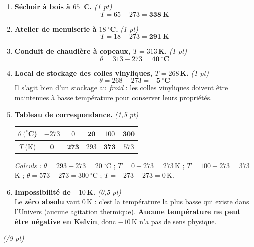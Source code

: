 \documentclass[a4paper,11pt]{article}
\begin{document}
\begin{enumerate}[label=\textbf{\arabic*.},leftmargin=*,itemsep=4pt]

\item \textbf{Séchoir à bois à $65\ ^\circ$C.} \hfill\textit{\small(1 pt)}
\[ T = 65 + 273 = \mathbf{338\ \text{K}} \]

\item \textbf{Atelier de menuiserie à $18\ ^\circ$C.} \hfill\textit{\small(1 pt)}
\[ T = 18 + 273 = \mathbf{291\ \text{K}} \]

\item \textbf{Conduit de chaudière à copeaux, $T = 313$\,K.} \hfill\textit{\small(1 pt)}
\[ \theta = 313 - 273 = \mathbf{40\ ^\circ\text{C}} \]

\item \textbf{Local de stockage des colles vinyliques, $T = 268$\,K.} \hfill\textit{\small(1 pt)}
\[ \theta = 268 - 273 = \mathbf{-5\ ^\circ\text{C}} \]
Il s'agit bien d'un stockage au \emph{froid} : les colles vinyliques doivent être maintenues à basse température pour conserver leurs propriétés.

\item \textbf{Tableau de correspondance.} \hfill\textit{\small(1,5 pt)}
\begin{center}
\renewcommand{\arraystretch}{1.35}
\begin{tabular}{|>{\columncolor{violetclair}}c|c|c|c|c|c|}
\hline
\rowcolor{violetclair}
$\theta\ (^\circ$C) & $-273$ & $0$ & $\mathbf{20}$ & $100$ & $\mathbf{300}$ \\
\hline
$T\ $(K) & $\mathbf{0}$ & $\mathbf{273}$ & $293$ & $\mathbf{373}$ & $573$ \\
\hline
\end{tabular}
\end{center}
\textit{Calculs :} $\theta = 293 - 273 = 20\ ^\circ$C ; $T = 0 + 273 = 273$\,K ; $T = 100 + 273 = 373$\,K ; $\theta = 573 - 273 = 300\ ^\circ$C ; $T = -273 + 273 = 0$\,K.

\item \textbf{Impossibilité de $-10$\,K.} \hfill\textit{\small(0,5 pt)}\\
Le \textbf{zéro absolu} vaut $0$\,K : c'est la température la plus basse qui existe dans l'Univers (aucune agitation thermique). \textbf{Aucune température ne peut être négative en Kelvin}, donc $-10$\,K n'a pas de sens physique.

\end{enumerate}

\vspace{10pt}
 \hfill\textit{\small(/9 pt)}
\end{document}
